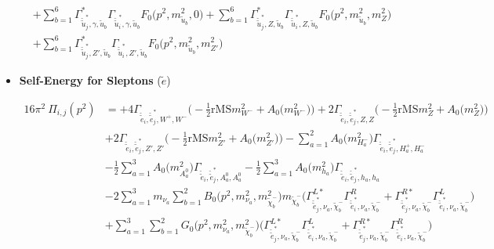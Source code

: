\begin{itemize}
\begin{align}
 &+\sum_{b=1}^{6}{\Gamma^*_{\check{\tilde{u}}^*_{{j}},\gamma,\tilde{u}_{{b}}}} {\Gamma_{\check{\tilde{u}}^*_{{i}},\gamma,\tilde{u}_{{b}}}} {F_0\Big(p^{2},m^2_{\tilde{u}_{{b}}},0\Big)} +\sum_{b=1}^{6}{\Gamma^*_{\check{\tilde{u}}^*_{{j}},Z,\tilde{u}_{{b}}}} {\Gamma_{\check{\tilde{u}}^*_{{i}},Z,\tilde{u}_{{b}}}} {F_0\Big(p^{2},m^2_{\tilde{u}_{{b}}},m^2_{Z}\Big)} \nonumber \\ 
 &+\sum_{b=1}^{6}{\Gamma^*_{\check{\tilde{u}}^*_{{j}},{Z'},\tilde{u}_{{b}}}} {\Gamma_{\check{\tilde{u}}^*_{{i}},{Z'},\tilde{u}_{{b}}}} {F_0\Big(p^{2},m^2_{\tilde{u}_{{b}}},m^2_{{Z'}}\Big)}  
\end{align} 
\item {\bf Self-Energy for Sleptons} \thickspace (\(\tilde{e}\)) 

\begin{align} 
16\pi^2 \ \Pi_{i,j}(p^2) &= +4 {\Gamma_{\check{\tilde{e}}_{{i}},\check{\tilde{e}}^*_{{j}},W^+,W^-}} \Big(-\frac{1}{2} \text{rMS} m^2_{W^-}  + {A_0\Big(m^2_{W^-}\Big)}\Big)+2 {\Gamma_{\check{\tilde{e}}_{{i}},\check{\tilde{e}}^*_{{j}},Z,Z}} \Big(-\frac{1}{2} \text{rMS} m^2_{Z}  + {A_0\Big(m^2_{Z}\Big)}\Big)\nonumber \\ 
 &+2 {\Gamma_{\check{\tilde{e}}_{{i}},\check{\tilde{e}}^*_{{j}},{Z'},{Z'}}} \Big(-\frac{1}{2} \text{rMS} m^2_{{Z'}}  + {A_0\Big(m^2_{{Z'}}\Big)}\Big)- \sum_{a=1}^{2}{A_0\Big(m^2_{H^-_{{a}}}\Big)} {\Gamma_{\check{\tilde{e}}_{{i}},\check{\tilde{e}}^*_{{j}},H^+_{{a}},H^-_{{a}}}}  \nonumber \\ 
 &-\frac{1}{2} \sum_{a=1}^{3}{A_0\Big(m^2_{A^0_{{a}}}\Big)} {\Gamma_{\check{\tilde{e}}_{{i}},\check{\tilde{e}}^*_{{j}},A^0_{{a}},A^0_{{a}}}}  -\frac{1}{2} \sum_{a=1}^{3}{A_0\Big(m^2_{h_{{a}}}\Big)} {\Gamma_{\check{\tilde{e}}_{{i}},\check{\tilde{e}}^*_{{j}},h_{{a}},h_{{a}}}}  \nonumber \\ 
 &-2 \sum_{a=1}^{3}m_{\nu_{{a}}} \sum_{b=1}^{2}{B_0\Big(p^{2},m^2_{\nu_{{a}}},m^2_{\tilde{\chi}^-_{{b}}}\Big)} m_{\tilde{\chi}^-_{{b}}} \Big({\Gamma^{L*}_{\check{\tilde{e}}^*_{{j}},\nu_{{a}},\tilde{\chi}^-_{{b}}}} {\Gamma^R_{\check{\tilde{e}}^*_{{i}},\nu_{{a}},\tilde{\chi}^-_{{b}}}}  + {\Gamma^{R*}_{\check{\tilde{e}}^*_{{j}},\nu_{{a}},\tilde{\chi}^-_{{b}}}} {\Gamma^L_{\check{\tilde{e}}^*_{{i}},\nu_{{a}},\tilde{\chi}^-_{{b}}}} \Big)  \nonumber \\ 
 &+\sum_{a=1}^{3}\sum_{b=1}^{2}{G_0\Big(p^{2},m^2_{\nu_{{a}}},m^2_{\tilde{\chi}^-_{{b}}}\Big)} \Big({\Gamma^{L*}_{\check{\tilde{e}}^*_{{j}},\nu_{{a}},\tilde{\chi}^-_{{b}}}} {\Gamma^L_{\check{\tilde{e}}^*_{{i}},\nu_{{a}},\tilde{\chi}^-_{{b}}}}  + {\Gamma^{R*}_{\check{\tilde{e}}^*_{{j}},\nu_{{a}},\tilde{\chi}^-_{{b}}}} {\Gamma^R_{\check{\tilde{e}}^*_{{i}},\nu_{{a}},\tilde{\chi}^-_{{b}}}} \Big)\nonumber \\ 

\end{align}
\end{itemize}
